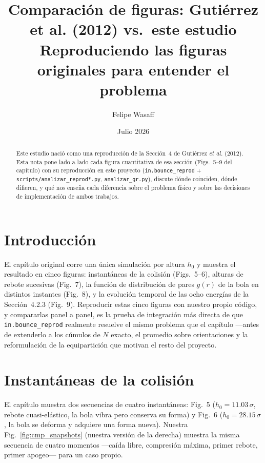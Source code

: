 \documentclass[11pt,a4paper]{article}
\title{\textbf{Comparación de figuras: Gutiérrez et al. (2012) vs.\ este estudio}\\
\large Reproduciendo las figuras originales para entender el problema}
\author{Felipe Wasaff}
\date{Julio 2026}
\begin{document}
\maketitle

\begin{abstract}
Este estudio nació como una reproducción de la Sección~4 de
Gutiérrez \emph{et al.} (2012)\cite{Gutierrez2012}. Esta nota pone lado a
lado cada figura cuantitativa de esa sección (Figs.~5--9 del capítulo) con
su reproducción en este proyecto (\texttt{in.bounce\_reprod} +
\texttt{scripts/analizar\_reprod*.py}, \texttt{analizar\_gr.py}), discute
dónde coinciden, dónde difieren, y qué nos enseña cada diferencia sobre el
problema físico y sobre las decisiones de implementación de ambos
trabajos.
\end{abstract}

\tableofcontents

\section{Introducción}

El capítulo original corre una única simulación por altura $h_0$ y
muestra el resultado en cinco figuras: instantáneas de la colisión
(Figs.~5--6), alturas de rebote sucesivas (Fig.~7), la función de
distribución de pares $g(r)$ de la bola en distintos instantes (Fig.~8), y
la evolución temporal de las ocho energías de la
Sección~4.2.3 (Fig.~9). Reproducir estas cinco figuras con nuestro propio
código, y compararlas panel a panel, es la prueba de integración más
directa de que \texttt{in.bounce\_reprod} realmente resuelve el mismo
problema que el capítulo ---antes de extenderlo a los cúmulos de $N$
exacto, el promedio sobre orientaciones y la reformulación de la
equipartición que motivan el resto del proyecto.

\section{Instantáneas de la colisión}

El capítulo muestra dos secuencias de cuatro instantáneas: Fig.~5
($h_0=11.03\,\sigma$, rebote cuasi-elástico, la bola vibra pero conserva
su forma) y Fig.~6 ($h_0=28.15\,\sigma$, la bola se deforma y adquiere una
forma nueva). Nuestra Fig.~\ref{fig:cmp_snapshots} (nuestra versión de la
derecha) muestra la misma secuencia de cuatro momentos ---caída libre,
compresión máxima, primer rebote, primer apogeo--- para un caso propio.
\end{document}
